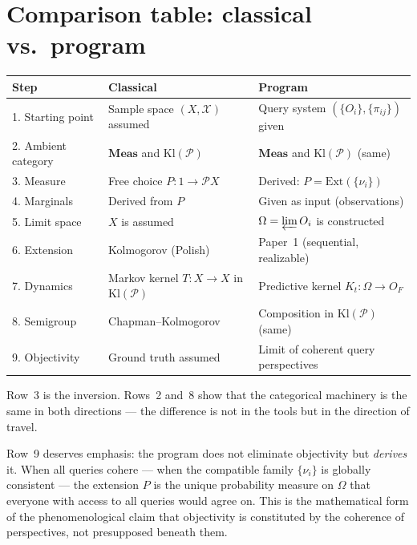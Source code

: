 \documentclass[11pt]{article}
\newcommand{\Meas}{\mathbf{Meas}}
\newcommand{\Kl}{\mathrm{Kl}}
\newcommand{\Pcal}{\mathcal{P}}
\newcommand{\Xcal}{\mathcal{X}}
\newcommand{\varlim}{\varprojlim}
\begin{document}
\section{Comparison table: classical vs.\ program}
\label{sec:comparison}

\begin{center}
\renewcommand{\arraystretch}{1.3}
\begin{tabular}{lll}
\hline
\textbf{Step} & \textbf{Classical} & \textbf{Program} \\
\hline
1. Starting point & Sample space $(X, \Xcal)$ assumed & Query system $(\{O_i\}, \{\pi_{ij}\})$ given \\
2. Ambient category & $\Meas$ and $\Kl(\Pcal)$ & $\Meas$ and $\Kl(\Pcal)$ (same) \\
3. Measure & Free choice $P : 1 \to \Pcal X$ & Derived: $P = \mathrm{Ext}(\{\nu_i\})$ \\
4. Marginals & Derived from $P$ & Given as input (observations) \\
5. Limit space & $X$ is assumed & $\Omega = \varlim O_i$ is constructed \\
6. Extension & Kolmogorov (Polish) & Paper~1 (sequential, realizable) \\
7. Dynamics & Markov kernel $T : X \to X$ in $\Kl(\Pcal)$ & Predictive kernel $K_t : \Omega \to O_F$ \\
8. Semigroup & Chapman--Kolmogorov & Composition in $\Kl(\Pcal)$ (same) \\
9. Objectivity & Ground truth assumed & Limit of coherent query perspectives \\
\hline
\end{tabular}
\end{center}

Row~3 is the inversion.  Rows~2 and~8 show that the categorical machinery
is the same in both directions --- the difference is not in the tools but in
the direction of travel.

Row~9 deserves emphasis: the program does not eliminate objectivity but
\emph{derives} it.  When all queries cohere --- when the compatible family
$\{\nu_i\}$ is globally consistent --- the extension $P$ is the unique
probability measure on $\Omega$ that everyone with access to all queries
would agree on.  This is the mathematical form of the phenomenological claim
that objectivity is constituted by the coherence of perspectives, not
presupposed beneath them.
\end{document}
